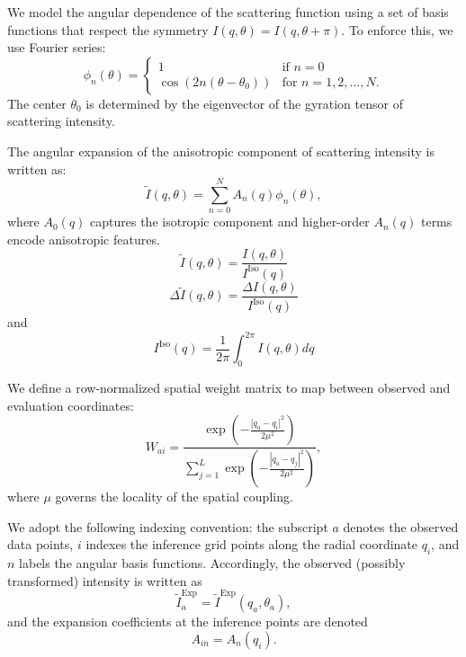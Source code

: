 \documentclass[12pt]{article}
\begin{document}
We model the angular dependence of the scattering function using a set of basis functions that respect the symmetry \( I(q, \theta) = I(q, \theta + \pi) \). To enforce this, we use Fourier series:
\begin{equation}
    \phi_n(\theta) = \begin{cases}
        1 & \text{if } n = 0 \\
        \cos(2n(\theta-\theta_0)) & \text{for } n = 1, 2, \ldots, N.
    \end{cases}
\end{equation} The center \( \theta_0 \) is determined by the eigenvector of the gyration tensor of scattering intensity.

The angular expansion of the anisotropic component of scattering intensity is written as:
\begin{equation}
    \tilde{I}(q, \theta) = \sum_{n=0}^{N} A_n(q) \phi_n(\theta),
    \label{eq:2}
\end{equation}
where \( A_0(q) \) captures the isotropic component and higher-order \( A_n(q) \) terms encode anisotropic features. 
\begin{equation}
\tilde{I}(q, \theta)=\frac{I(q, \theta)}{I^\mathrm{Iso}(q)}
\end{equation}
\begin{equation}
\Delta\tilde{I}(q, \theta)=\frac{\Delta I(q, \theta)}{I^\mathrm{Iso}(q)}
\end{equation}
and 
\begin{equation}
I^\mathrm{Iso}(q) = 
\frac{1}{2\pi}\int_0^{2\pi} I(q, \theta) dq
\end{equation}

We define a row-normalized spatial weight matrix to map between observed and evaluation coordinates:
\begin{equation}
    W_{ai} = \frac{\exp\left(-\frac{|q_a - q_i|^2}{2\mu^2}\right)}{\sum_{j=1}^{L} \exp\left(-\frac{|q_a - q_j|^2}{2\mu^2}\right)},
    \label{eq:W_ai}
\end{equation}
where \( \mu \) governs the locality of the spatial coupling.

We adopt the following indexing convention: the subscript \( a \) denotes the observed data points, \( i \) indexes the inference grid points along the radial coordinate \( q_i \), and \( n \) labels the angular basis functions. Accordingly, the observed (possibly transformed) intensity is written as
\begin{equation}
\tilde{I}_a^{\mathrm{Exp}} = \tilde{I}^{\mathrm{Exp}}(q_a, \theta_a),
\end{equation}
and the expansion coefficients at the inference points are denoted
\begin{equation}
A_{in} = A_n(q_i).
\end{equation}
\end{document}

